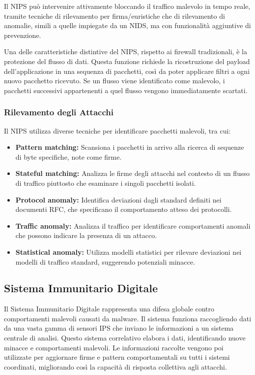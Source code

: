 Il NIPS può intervenire attivamente bloccando il traffico malevolo in tempo reale, tramite tecniche di rilevamento per firma/euristiche che di rilevamento di anomalie, simili a quelle impiegate da un NIDS, ma con funzionalità aggiuntive di prevenzione.

Una delle caratteristiche distintive del NIPS, rispetto ai firewall tradizionali, è la protezione del flusso di dati. Questa funzione richiede la ricostruzione del payload dell'applicazione in una sequenza di pacchetti, così da poter applicare filtri a ogni nuovo pacchetto ricevuto. Se un flusso viene identificato come malevolo, i pacchetti successivi appartenenti a quel flusso vengono immediatamente scartati.

\subsubsection{Rilevamento degli Attacchi}

Il NIPS utilizza diverse tecniche per identificare pacchetti malevoli, tra cui:

\begin{itemize}
    \item \textbf{Pattern matching:} Scansiona i pacchetti in arrivo alla ricerca di sequenze di byte specifiche, note come firme.
    \item \textbf{Stateful matching:} Analizza le firme degli attacchi nel contesto di un flusso di traffico piuttosto che esaminare i singoli pacchetti isolati.
    \item \textbf{Protocol anomaly:} Identifica deviazioni dagli standard definiti nei documenti RFC, che specificano il comportamento atteso dei protocolli.
    \item \textbf{Traffic anomaly:} Analizza il traffico per identificare comportamenti anomali che possono indicare la presenza di un attacco.
    \item \textbf{Statistical anomaly:} Utilizza modelli statistici per rilevare deviazioni nei modelli di traffico standard, suggerendo potenziali minacce.
\end{itemize}

\subsection{Sistema Immunitario Digitale}

Il Sistema Immunitario Digitale rappresenta una difesa globale contro comportamenti malevoli causati da malware. Il sistema funziona raccogliendo dati da una vasta gamma di sensori IPS che inviano le informazioni a un sistema centrale di analisi. Questo sistema correlativo elabora i dati, identificando nuove minacce e comportamenti malevoli. Le informazioni raccolte vengono poi utilizzate per aggiornare firme e pattern comportamentali su tutti i sistemi coordinati, migliorando così la capacità di risposta collettiva agli attacchi.

